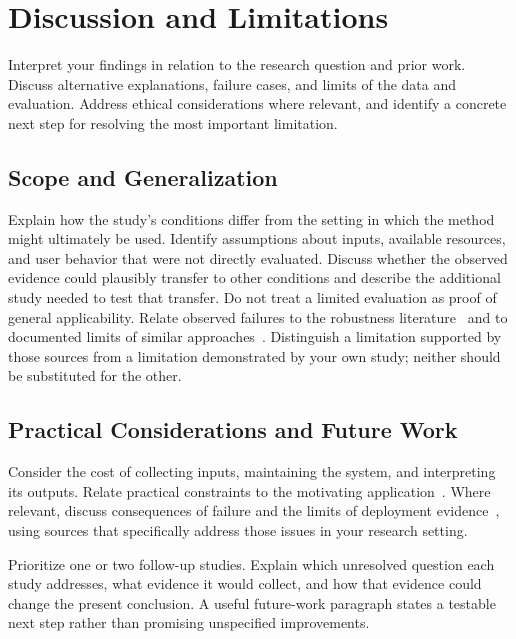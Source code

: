 \section{Discussion and Limitations}
\label{sec:discussion}
Interpret your findings in relation to the research question and prior work.
Discuss alternative explanations, failure cases, and limits of the data
and evaluation. Address ethical considerations where relevant, and identify
a concrete next step for resolving the most important limitation.

\subsection{Scope and Generalization}
Explain how the study's conditions differ from the setting in which the
method might ultimately be used. Identify assumptions about inputs,
available resources, and user behavior that were not directly evaluated.
Discuss whether the observed evidence could plausibly transfer to other
conditions and describe the additional study needed to test that transfer.
Do not treat a limited evaluation as proof of general applicability.
Relate observed failures to the robustness literature~\cite{robustness} and
to documented limits of similar approaches~\cite{limitations}. Distinguish
a limitation supported by those sources from a limitation demonstrated by
your own study; neither should be substituted for the other.

\subsection{Practical Considerations and Future Work}
Consider the cost of collecting inputs, maintaining the system, and
interpreting its outputs. Relate practical constraints to the motivating
application~\cite{application}. Where relevant, discuss consequences of
failure and the limits of deployment evidence~\cite{limitations}, using
sources that specifically address those issues in your research setting.

Prioritize one or two follow-up studies. Explain which unresolved question
each study addresses, what evidence it would collect, and how that evidence
could change the present conclusion. A useful future-work paragraph states
a testable next step rather than promising unspecified improvements.
